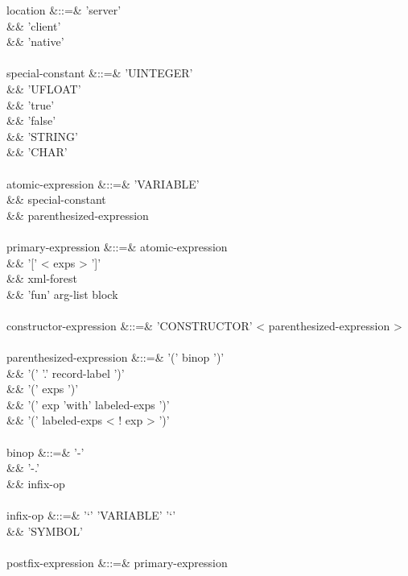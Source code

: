 \documentclass[11pt,a4paper]{article}
\begin{document}
\begin{grammar}
location &::=& 'server' \\
&&             'client' \\
&&             'native' \\
\\
special-constant &::=& 'UINTEGER' \\
&&                     'UFLOAT' \\
&&                     'true' \\
&&                     'false' \\
&&                     'STRING' \\
&&                     'CHAR' \\
\\
atomic-expression &::=& 'VARIABLE' \\
&&                      special-constant \\
&&                      parenthesized-expression \\
\\
primary-expression &::=& atomic-expression \\
&&                       '[' < exps > ']' \\
&&                       xml-forest \\
&&                       'fun' arg-list block \\
\\
constructor-expression &::=& 'CONSTRUCTOR' < parenthesized-expression > \\
\\
parenthesized-expression &::=&  '(' binop ')' \\
&&                              '(' '.' record-label ')' \\
&&                              '(' exps ')' \\
&&                              '(' exp 'with' labeled-exps ')' \\
&&                              '(' labeled-exps < ! exp > ')' \\
\\
binop &::=& '-' \\
&&          '-.' \\
&&          infix-op \\
\\
infix-op &::=&  '`' 'VARIABLE' '`' \\
&&              'SYMBOL' \\
\\
postfix-expression &::=&  primary-expression \\

\end{grammar}
\end{document}

